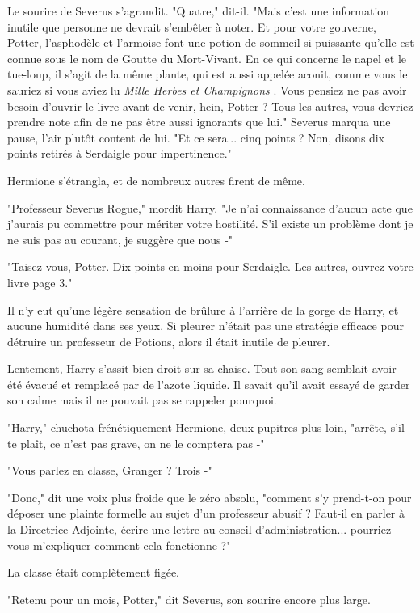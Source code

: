 Le sourire de Severus s'agrandit. "Quatre," dit-il. "Mais c'est une information inutile que personne ne devrait s'embêter à noter. Et pour votre gouverne, Potter, l'asphodèle et l'armoise font une potion de sommeil si puissante qu'elle est connue sous le nom de Goutte du Mort-Vivant. En ce qui concerne le napel et le tue-loup, il s'agit de la même plante, qui est aussi appelée aconit, comme vous le sauriez si vous aviez lu \emph{Mille Herbes et Champignons} . Vous pensiez ne pas avoir besoin d'ouvrir le livre avant de venir, hein, Potter ? Tous les autres, vous devriez prendre note afin de ne pas être aussi ignorants que lui." Severus marqua une pause, l'air plutôt content de lui. "Et ce sera... cinq points ? Non, disons dix points retirés à Serdaigle pour impertinence."

Hermione s'étrangla, et de nombreux autres firent de même.

"Professeur Severus Rogue," mordit Harry. "Je n'ai connaissance d'aucun acte que j'aurais pu commettre pour mériter votre hostilité. S'il existe un problème dont je ne suis pas au courant, je suggère que nous -"

"Taisez-vous, Potter. Dix points en moins pour Serdaigle. Les autres, ouvrez votre livre page 3."

Il n'y eut qu'une légère sensation de brûlure à l'arrière de la gorge de Harry, et aucune humidité dans ses yeux. Si pleurer n'était pas une stratégie efficace pour détruire un professeur de Potions, alors il était inutile de pleurer.

Lentement, Harry s'assit bien droit sur sa chaise. Tout son sang semblait avoir été évacué et remplacé par de l'azote liquide. Il savait qu'il avait essayé de garder son calme mais il ne pouvait pas se rappeler pourquoi.

"Harry," chuchota frénétiquement Hermione, deux pupitres plus loin, "arrête, s'il te plaît, ce n'est pas grave, on ne le comptera pas -"

"Vous parlez en classe, Granger ? Trois -"

"Donc," dit une voix plus froide que le zéro absolu, "comment s'y prend-t-on pour déposer une plainte formelle au sujet d'un professeur abusif ? Faut-il en parler à la Directrice Adjointe, écrire une lettre au conseil d'administration... pourriez-vous m'expliquer comment cela fonctionne ?"

La classe était complètement figée.

"Retenu pour un mois, Potter," dit Severus, son sourire encore plus large.

